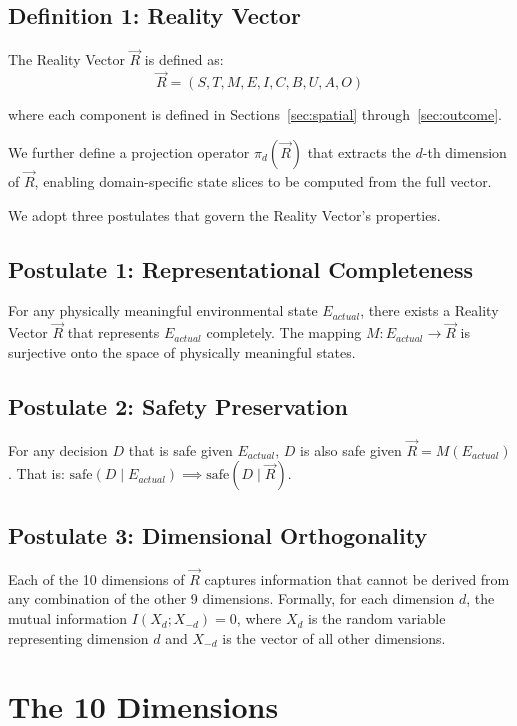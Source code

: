 \documentclass[12pt]{article}
\begin{document}
\subsection*{Definition 1: Reality Vector}
\label{def:rv}
The Reality Vector $\vec{R}$ is defined as:
$$\vec{R} = (S, T, M, E, I, C, B, U, A, O)$$

where each component is defined in Sections~\ref{sec:spatial} through~\ref{sec:outcome}.

We further define a projection operator $\pi_d(\vec{R})$ that extracts the $d$-th dimension of $\vec{R}$, enabling domain-specific state slices to be computed from the full vector.

We adopt three postulates that govern the Reality Vector's properties.

\subsection*{Postulate 1: Representational Completeness}
\label{post:rv1}
For any physically meaningful environmental state $E_{actual}$, there exists a Reality Vector $\vec{R}$ that represents $E_{actual}$ completely. The mapping $M: E_{actual} \rightarrow \vec{R}$ is surjective onto the space of physically meaningful states.

\subsection*{Postulate 2: Safety Preservation}
\label{post:rv2}
For any decision $D$ that is safe given $E_{actual}$, $D$ is also safe given $\vec{R} = M(E_{actual})$. That is: $\text{safe}(D \mid E_{actual}) \implies \text{safe}(D \mid \vec{R})$.

\subsection*{Postulate 3: Dimensional Orthogonality}
\label{post:rv3}
Each of the 10 dimensions of $\vec{R}$ captures information that cannot be derived from any combination of the other 9 dimensions. Formally, for each dimension $d$, the mutual information $I(X_d; X_{-d}) = 0$, where $X_d$ is the random variable representing dimension $d$ and $X_{-d}$ is the vector of all other dimensions.

\section{The 10 Dimensions}
\label{sec:dimensions}
\end{document}
